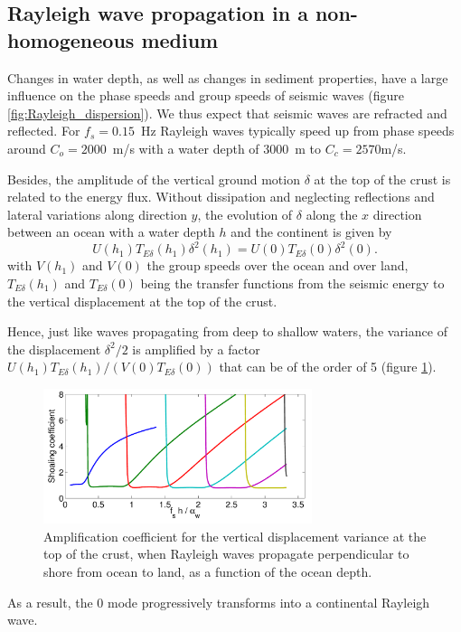 \subsection{Rayleigh wave propagation in a non-homogeneous medium}
Changes in water depth, as well as changes in sediment properties, have a large influence on the phase speeds and group speeds of seismic waves (figure \ref{fig:Rayleigh_dispersion}). We thus expect  that seismic waves are refracted and reflected. For $f_s=0.15$~Hz   Rayleigh waves typically speed up from phase speeds around $C_o=2000$~m/s with a water depth of 3000~m to  $C_c=2570$m/s. 

Besides, the amplitude of the vertical ground motion $\delta$ at the top 
of the crust is related to the energy flux. 
Without dissipation and neglecting reflections and lateral variations 
along   direction $y$, the evolution of $\delta$ along the $x$ direction 
between an ocean with a water depth $h$ and the continent is given by 
\begin{equation}
U(h_1) T_{E \delta}(h_1) \delta^2(h_1) = U(0) T_{E \delta}(0) \delta^2(0). 
\end{equation}
with $V(h_1)$ and $V(0)$ the group speeds over the ocean and over land, 
$T_{E \delta}(h_1)$ and $T_{E \delta}(0)$ being the transfer functions from the seismic energy to the vertical displacement at the top of the crust. 

Hence, just like waves propagating from deep 
to  shallow waters,
the variance of the displacement $\delta^2/2$ is amplified by a factor 
$U(h_1) T_{E \delta}(h_1) /(V(0) T_{E \delta}(0))$ that can be of the order of 
5 (figure \ref{fig:Rayleigh_shoaling}).
\begin{figure}
\centerline{\includegraphics[width=0.7\textwidth]{FIGS_CH_SISMO/Rayleigh_shoaling.pdf}}
  \caption{Amplification coefficient for the vertical displacement variance at the top of the crust, when Rayleigh waves propagate perpendicular to shore from ocean to land, as a function of the ocean depth.}
\label{fig:Rayleigh_shoaling}
\end{figure}
As a result, the 0 mode progressively transforms into a continental Rayleigh wave. 


